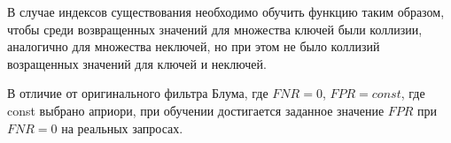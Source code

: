 

В случае индексов существования необходимо обучить функцию таким образом, чтобы
среди возвращенных значений для множества ключей были коллизии, аналогично для
множества неключей, но при этом не было коллизий возращенных значений для ключей
и неключей. 

В отличие от оригинального фильтра Блума, где $FNR = 0$, $FPR = const$, где
const выбрано априори, при обучении достигается заданное значение $FPR$ при $FNR
= 0$ на реальных запросах.
